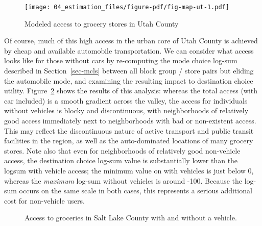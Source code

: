 \documentclass[
  letterpaper,
  DIV=11,
  numbers=noendperiod]{scrreport}
\begin{document}
\begin{figure}[t]

{\centering \texttt{[image: 04\_estimation\_files/figure-pdf/fig-map-ut-1.pdf]}

}

\caption{\label{fig-map-ut}Modeled access to grocery stores in Utah
County}

\end{figure}

Of course, much of this high access in the urban core of Utah County is
achieved by cheap and available automobile transportation. We can
consider what access looks like for those without cars by re-computing
the mode choice log-sum described in Section~\ref{sec-mcls} between all
block group / store pairs but eliding the automobile mode, and examining
the resulting impact to destination choice utility.
Figure~\ref{fig-map-nocar} shows the results of this analysis: whereas
the total access (with car included) is a smooth gradient across the
valley, the access for individuals without vehicles is blocky and
discontinuous, with neighborhoods of relatively good access immediately
next to neighborhoods with bad or non-existent access. This may reflect
the discontinuous nature of active transport and public transit
facilities in the region, as well as the auto-dominated locations of
many grocery stores. Note also that even for neighborhoods of relatively
good non-vehicle access, the destination choice log-sum value is
substantially lower than the logsum with vehicle access; the minimum
value on with vehicles is just below 0, whereas the \emph{maximum}
log-sum without vehicles is around -100. Because the log-sum occurs on
the same scale in both cases, this represents a serious additional cost
for non-vehicle users.

\begin{figure}

\begin{minipage}[t]{0.50\linewidth}

{\centering 


}

\end{minipage}%
%
\begin{minipage}[t]{0.50\linewidth}

{\centering 


}

\end{minipage}%

\caption{\label{fig-map-nocar}Access to groceries in Salt Lake County
with and without a vehicle.}

\end{figure}
\end{document}

